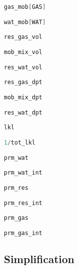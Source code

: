 \documentclass[12pt]{scrartcl}
\newcommand{\wid}[1]{\widthof{\bfseries {#1} \hspace{\labelsep}}}
\newcommand{\aleft}{\mathopen{}\mathclose\bgroup\left}  %
\newcommand{\aright}{\aftergroup\egroup\right}          %
\newcommand{\binop}[3]{#1\mkern1mu{#2}\mkern1mu #3}     %
\newcommand{\dual}[1]{\binop{1}{-}{#1}}                 %
\newcommand{\ddual}[2]{\binop{\binop{1}{-}{#1}}{-}{#2}} %
\newcommand{\intg}[4]{\int_{#1}^{#2}\!{#3}\,\mathrm{d}{#4}}   %
\newcommand{\inv}[1]{{#1}^{-1}}                               %
\newcommand{\latr}[1]{{#1}_{\|}}                              %
\newcommand{\magn}[1]{{#1}_|}                                 %
\newcommand{\por}{\phi}     %
\newcommand{\sat}{s}        %
\newcommand{\sr}[1]{\sat_{#1,r}}    %
\newcommand{\Prm}{K}        %
\newcommand{\prm}{k}        %
\newcommand{\rlp}[1]{k_{r,#1}}  %
\newcommand{\Lev}{\zeta}    %
\newcommand{\Mob}{M}        %
\newcommand{\dph}{z}        %
\newcommand{\nap}{c}        %
\newcommand{\wet}{b}        %
\newcommand{\h}{h}          %
\newcommand{\krnwr}{c}      %
\newcommand{\krwnr}{b}      %
\newcommand{\snr}{\sr{\nap}}    %
\newcommand{\swr}{\sr{\wet}}    %
\newcommand{\LevM}{\Lev_\Mob}
\newcommand{\rlpn}{\rlp{\nap}}
\newcommand{\rlpw}{\rlp{\wet}}
\begin{document}
\begin{description}[labelwidth=\wid{\( \intg{ \h }{ \LevM }{ \por \left( \ddual{ \swr }{ \snr } \right) }{ \dph } \)}]
\item[ \( \rlpn \aleft( \dual{\swr} \aright) = \krnwr \) ] \lstinline[language=C++]!gas_mob[GAS]!
\item[ \( \rlpw \aleft( \snr \aright) = \krwnr \) ] \lstinline[language=C++]!wat_mob[WAT]!
\item[ \( \por \snr \) ] \lstinline[language=C++]!res_gas_vol!
\item[ \( \por \left( \ddual{ \swr }{ \snr } \right) \) ] \lstinline[language=C++]!mob_mix_vol!
\item[ \( \por \left( \dual{ \swr } \right) \) ] \lstinline[language=C++]!res_wat_vol!
\item[ \( \intg{ \h }{ \LevM }{ \por \snr }{ \dph } \) ] \lstinline[language=C++]!res_gas_dpt!
\item[ \( \intg{ \h }{ \LevM }{ \por \left( \ddual{ \swr }{ \snr } \right) }{ \dph } \) ] \lstinline[language=C++]!mob_mix_dpt!
\item[ \( \intg{ \h }{ \LevM }{ \por \left( \dual{ \swr } \right) }{ \dph } \) ] \lstinline[language=C++]!res_wat_dpt!
\item[ \( \magn{ \prm } \) ] \lstinline[language=C++]!lkl!
\item[ \( \inv{ \Prm } \) ] \lstinline[language=C++]!1/tot_lkl!
\item[ \( \inv{ \Prm } \latr{ \prm } \cdot \left( \dual{ \krwnr } \right) \) ] \lstinline[language=C++]!prm_wat!
\item[ \( \inv{ \Prm } \intg{ \h }{ \LevM }{ \latr{ \prm } \cdot \left( \dual{ \krwnr } \right) }{ \dph } \) ] \lstinline[language=C++]!prm_wat_int!
\item[ \( \inv{ \Prm } \latr{ \prm } \cdot \krwnr \) ] \lstinline[language=C++]!prm_res!
\item[ \( \inv{ \Prm } \intg{ \h }{ \LevM }{ \latr{ \prm } \cdot \krwnr }{ \dph } \) ] \lstinline[language=C++]!prm_res_int!
\item[ \( \inv{ \Prm } \latr{ \prm } \cdot \krnwr \) ] \lstinline[language=C++]!prm_gas!
\item[ \( \inv{ \Prm } \intg{ \h }{ \LevM }{ \latr{ \prm } \cdot \krnwr }{ \dph } \) ] \lstinline[language=C++]!prm_gas_int!
\end{description}

\subsection{Simplification}
\end{document}
